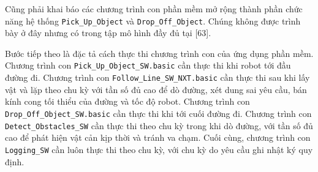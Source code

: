 Cũng phải khai báo các chương trình con phần mềm mở rộng thành phần chức năng hệ thống \texttt{Pick\_Up\_Object} và \texttt{Drop\_Off\_Object}. Chúng không được trình bày ở đây nhưng có trong tập mô hình đầy đủ tại [63].

Bước tiếp theo là đặc tả cách thực thi chương trình con của ứng dụng phần mềm. Chương trình con \texttt{Pick\_Up\_Object\_SW.basic} cần thực thi khi robot tới đầu đường đi. Chương trình con \texttt{Follow\_Line\_SW\_NXT.basic} cần thực thi sau khi lấy vật và lặp theo chu kỳ với tần số đủ cao để dò đường, xét dung sai yêu cầu, bán kính cong tối thiểu của đường và tốc độ robot. Chương trình con \texttt{Drop\_Off\_Object\_SW.basic} cần thực thi khi tới cuối đường đi. Chương trình con \texttt{Detect\_Obstacles\_SW} cần thực thi theo chu kỳ trong khi dò đường, với tần số đủ cao để phát hiện vật cản kịp thời và tránh va chạm. Cuối cùng, chương trình con \texttt{Logging\_SW} cần luôn thực thi theo chu kỳ, với chu kỳ do yêu cầu ghi nhật ký quy định.


